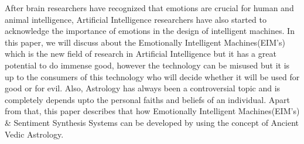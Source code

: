After brain researchers have recognized that emotions are crucial for human and animal intelligence, Artificial Intelligence researchers have also started to acknowledge the importance of emotions in the design of intelligent machines. In this paper, we will discuss about the Emotionally Intelligent Machines(EIM's) which is the new field of research in Artificial Intelligence but it has a great potential to do immense good, however the technology can be misused but it is up to the consumers of this technology who will decide whether it will be used for good or for evil. Also, Astrology has always been a controversial topic and is completely depends upto the personal faiths and beliefs of an individual. Apart from that, this paper describes that how Emotionally Intelligent Machines(EIM's) \& Sentiment Synthesis Systems can be developed by using the concept of Ancient Vedic Astrology.